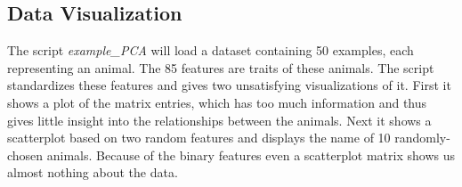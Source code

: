 \documentclass{article}
\begin{document}
\subsection{Data Visualization}

The script \emph{example\_PCA} will load a dataset containing 50 examples, each representing an animal. The 85 features are traits of these animals. The script standardizes these features and gives two unsatisfying visualizations of it. First it shows a plot of the matrix entries, which has too much information and thus gives little insight into the relationships between the animals. Next it shows a scatterplot based on two random features and displays the name of 10 randomly-chosen animals. Because of the binary features even a scatterplot matrix shows us almost nothing about the data.
\end{document}
